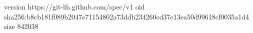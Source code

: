 version https://git-lfs.github.com/spec/v1
oid sha256:b8cb181f089b2047e71154802a73ddb234260cd37e13ea50d99618cf0035a1d4
size 842038
